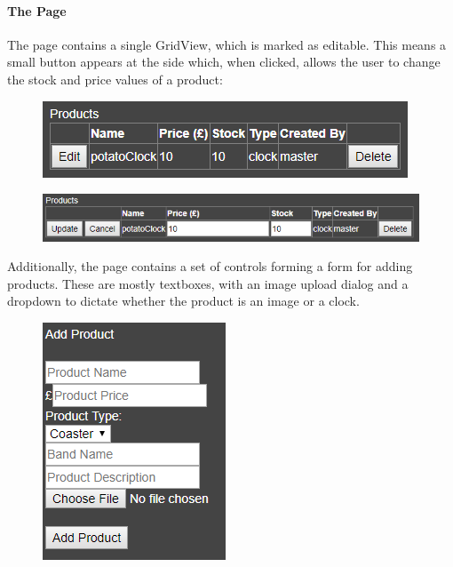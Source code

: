 ﻿\documentclass{article}
\begin{document}
    \paragraph{The Page}
    The page contains a single GridView, which is marked as editable.
    This means a small button appears at the side which, when clicked, allows the user to change the stock and price values of a product:
    \begin{figure}[h]
        \includegraphics{productsConfigTable.png}
        \centering
    \end{figure}
    \begin{figure}[h]
        \includegraphics{productsConfigEditing.png}
        \centering
    \end{figure}
    Additionally, the page contains a set of controls forming a form for adding products.
    These are mostly textboxes, with an image upload dialog and a dropdown to dictate whether the product is an image or a clock.
    \begin{figure}[h]
        \includegraphics{productForm.png}
        \centering
    \end{figure}
\end{document}
